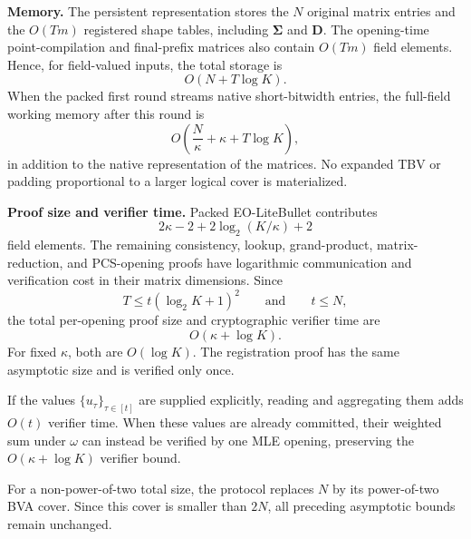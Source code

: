 \mysmallskip\noindent
\textbf{Memory.}
The persistent representation stores the $N$ original matrix entries and the
$O(Tm)$ registered shape tables, including $\bm\Sigma$ and $\bm D$.  The
opening-time point-compilation and final-prefix matrices also contain
$O(Tm)$ field elements.  Hence, for field-valued inputs, the total storage is
\[
    O(N+T\log K).
\]
When the packed first round streams native short-bitwidth entries, the
full-field working memory after this round is
\[
    O\left(
        \frac{N}{\kappa}
        +
        \kappa
        +
        T\log K
    \right),
\]
in addition to the native representation of the matrices.  No expanded TBV
or padding proportional to a larger logical cover is materialized.

\mysmallskip\noindent
\textbf{Proof size and verifier time.}
Packed EO-LiteBullet contributes
\[
    2\kappa-2
    +
    2\log_2(K/\kappa)
    +
    2
\]
field elements.  The remaining consistency, lookup, grand-product,
matrix-reduction, and PCS-opening proofs have logarithmic communication and
verification cost in their matrix dimensions.  Since
\[
    T\le t(\log_2K+1)^2
    \qquad\text{and}\qquad
    t\le N,
\]
the total per-opening proof size and cryptographic verifier time are
\[
    O(\kappa+\log K).
\]
For fixed $\kappa$, both are $O(\log K)$.  The registration proof has the
same asymptotic size and is verified only once.

If the values $\{u_\tau\}_{\tau\in[t]}$ are supplied explicitly, reading and
aggregating them adds $O(t)$ verifier time.  When these values are already
committed, their weighted sum under $\omega$ can instead be verified by one
MLE opening, preserving the $O(\kappa+\log K)$ verifier bound.

For a non-power-of-two total size, the protocol replaces $N$ by its
power-of-two BVA cover.  Since this cover is smaller than $2N$, all preceding
asymptotic bounds remain unchanged.





